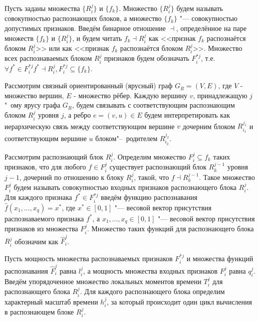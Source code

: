 \documentclass[a4paper, 12pt]{article}
\theoremstyle{plain}
\begin{document}
	Пусть заданы множества $\{R_i^j\}$ и $\{f_k\}$. Множество $\{R_i^j\}$ будем называть совокупностью распознающих блоков, а множество $\{f_k\}$ "--- совокупностью допустимых признаков. Введём бинарное отношение $\dashv$, определённое на паре множеств $\{f_k\}$ и $\{R_i^j\}$, и будем читать $f_k{\dashv}R_i^j$ как <<признак $f_k$ распознаётся блоком $R_i^j$>> или как <<признак $f_k$ распознаётся блоком $R_i^j$>>. Множество всех распознаваемых блоком $R_i^j$ признаков будем обозначать $F_i^{*j}$, т.е. ${\forall}f^*{\in}F_i^{*j} f^*{\dashv}R_i^j, F_i^{*j}{\subseteq}\{f_k\}$.
	
	Рассмотрим связный ориентированный (ярусный) граф $G_R=(V,E)$, где $V$ - множество вершин, $E$ - множество рёбер. Каждую вершину $v$, принадлежащую $j$"~ому ярусу графа $G_R$, будем связывать с соответствующим распознающим блоком $R_i^j$ уровня $j$, а ребро $e=(v,u){\in}E$ будем интерпретировать как иерархическую связь между соответствующим вершине $v$ дочерним блоком $R_{i_1}^{j_1 }$ и соответствующим вершине $u$ блоком"--~родителем $R_{i_2}^{j_2}$.
	
	Рассмотрим распознающий блок $R_i^j$. Определим множество $F_i^j{\subseteq}{f_k}$ таких признаков, что для любого $f{\in}F_i^j$ существует распознающий блок $R_k^{j-1}$ уровня $j-1$, дочерний по отношению к блоку $R_i^j$, такой, что $f{\dashv}R_k^{j-1}$. Такое множество $F_i^j$ будем называть совокупностью входных признаков распознающего блока $R_i^j$. Для каждого признака $f^*{\in}F_i^{*j}$ введём функцию распознавания $\hat{f}(x_1,\dots,x_q )=x^*$, где $x^*{\in}[0,1]$ "--- весовой вектор присутствия распознаваемого признака $f^*$, а $x_1,\dots,x_q{\in}[0,1]$ "--- весовой вектор присутствия признаков из множества $F_i^j$. Множество таких функций для распознающего блока $R_i^j$ обозначим как $\hat{F}_i^j$.
	
	Пусть мощность множества распознаваемых признаков $F_i^{*j}$ и множества функций распознавания $\hat{F}_i^j$ равна $l_i^j$, а мощность множества входных признаков $F_i^j$ равна $q_i^j$. Введём упорядоченное множество локальных моментов времени $T_i^j$ для распознающего блока $R_i^j$. Для каждого распознающего блока определим характерный масштаб времени $h_i^j$, за который происходит один цикл вычисления в распознающем блоке $R_i^j$. 
	
\end{document}
